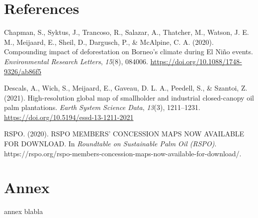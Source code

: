 \documentclass[
]{article}
\newlength{\cslhangindent}
\newlength{\cslentryspacingunit} %
\newenvironment{CSLReferences}[2] %
 {%
  \setlength{\parindent}{0pt}
  \ifodd #1
  \let\oldpar\par
  \def\par{\hangindent=\cslhangindent\oldpar}
  \fi
  \setlength{\parskip}{#2\cslentryspacingunit}
 }%
 {}
\begin{document}
\hypertarget{references}{%
\section{References}\label{references}}

\hypertarget{refs}{}
\begin{CSLReferences}{1}{0}
\leavevmode{}%
Chapman, S., Syktus, J., Trancoso, R., Salazar, A., Thatcher, M.,
Watson, J. E. M., Meijaard, E., Sheil, D., Dargusch, P., \& McAlpine, C.
A. (2020). Compounding impact of deforestation on {Borneo}'s climate
during {El Niño} events. \emph{Environmental Research Letters},
\emph{15}(8), 084006. \url{https://doi.org/10.1088/1748-9326/ab86f5}

\leavevmode{}%
Descals, A., Wich, S., Meijaard, E., Gaveau, D. L. A., Peedell, S., \&
Szantoi, Z. (2021). High-resolution global map of smallholder and
industrial closed-canopy oil palm plantations. \emph{Earth System
Science Data}, \emph{13}(3), 1211--1231.
\url{https://doi.org/10.5194/essd-13-1211-2021}

\leavevmode{}%
RSPO. (2020). {RSPO MEMBERS}' {CONCESSION MAPS NOW AVAILABLE FOR
DOWNLOAD}. In \emph{Roundtable on Sustainable Palm Oil (RSPO)}.
https://rspo.org/rspo-members-concession-maps-now-available-for-download/.

\end{CSLReferences}

\listoffigures

\listoftables

\hypertarget{annex}{%
\section*{Annex}\label{annex}}

annex blabla
\end{document}
